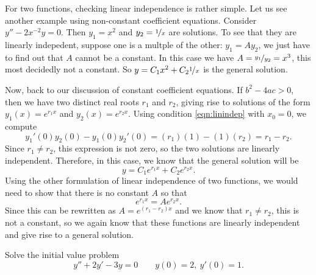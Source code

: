 \documentclass{ximera}
\begin{document}
For two functions, checking linear independence is rather simple.  Let us see another example using non-constant coefficient equations.  Consider $y''-2x^{-2}y = 0$.  Then $y_1 = x^2$ and $y_2 = \nicefrac{1}{x}$ are solutions.  To see that they are linearly indepedent, suppose one is a multple of the other: $y_1 = A y_2$, we just have to find out that $A$ cannot be a constant.  In this case we have $A = \nicefrac{y_1}{y_2} = x^3$, this most decidedly not a constant. So $y = C_1 x^2 + C_2 \nicefrac{1}{x}$ is the general solution.

Now, back to our discussion of constant coefficient equations. If $b^2 - 4ac > 0$, then we have two distinct real roots $r_1$ and $r_2$, giving rise to solutions of the form $y_1(x) = e^{r_1x}$ and $y_2(x) = e^{r_2x}$. Using condition \ref{eqn:linindep} with $x_0 = 0$, we compute
\begin{equation*}
    y_1'(0)y_2(0) - y_1(0)y_2'(0) = (r_1)(1) - (1)(r_2) = r_1 - r_2.
\end{equation*}
Since $r_1 \neq r_2$, this expression is not zero, so the two solutions are linearly independent. Therefore, in this case, we know that the general solution will be
\begin{equation*}
    y = C_1e^{r_1x} + C_2e^{r_2x}.
\end{equation*}
Using the other formulation of linear independence of two functions, we would need to show that there is no constant $A$ so that 
\[ 
    e^{r_1x} = A e^{r_2x}. 
\] 
Since this can be rewritten as $A = e^{(r_1-r_2)x}$ and we know that $r_1 \neq r_2$, this is not a constant, so we again know that these functions are linearly independent and give rise to a general solution.

\begin{example}
    Solve the initial value problem
    \begin{equation*}
        y'' + 2y' - 3y = 0 \qquad y(0) = 2,\ y'(0) = 1. 
    \end{equation*}
\end{example}
\end{document}
